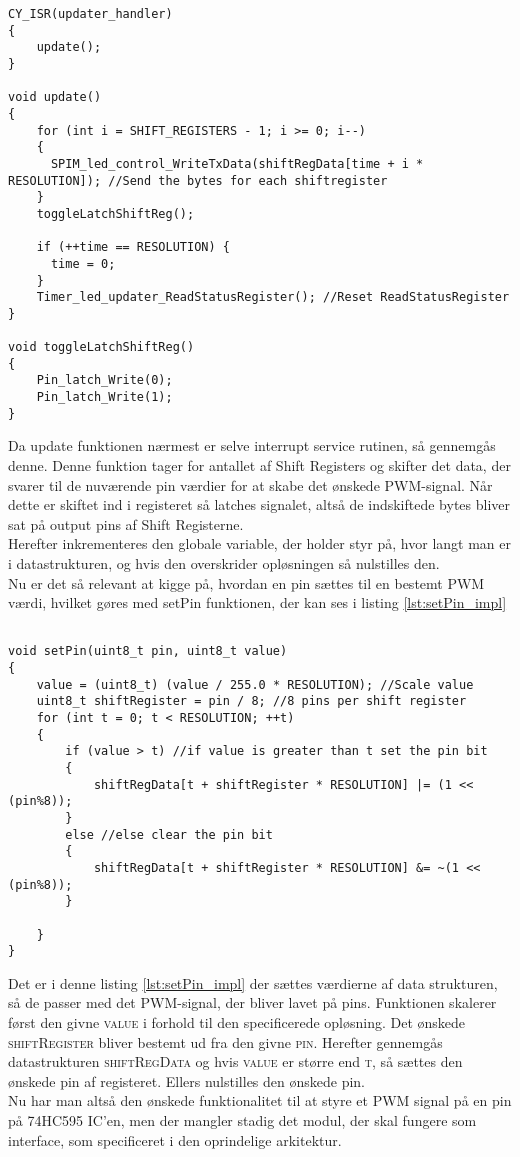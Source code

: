 \documentclass[Softwaredesign/Softwaredesign_main.tex]{subfiles}
\begin{document}
\begin{lstlisting}[caption={ISR & Update}, label={lst:ISR_Update_impl}, style=customc]
CY_ISR(updater_handler)
{
    update();
}                   

void update()
{
    for (int i = SHIFT_REGISTERS - 1; i >= 0; i--)
    {
      SPIM_led_control_WriteTxData(shiftRegData[time + i * RESOLUTION]); //Send the bytes for each shiftregister
    }
    toggleLatchShiftReg();
    
    if (++time == RESOLUTION) {
      time = 0;
    }
    Timer_led_updater_ReadStatusRegister(); //Reset ReadStatusRegister
}

void toggleLatchShiftReg()
{
    Pin_latch_Write(0);
    Pin_latch_Write(1);
}
\end{lstlisting}

Da update funktionen nærmest er selve interrupt service rutinen, så gennemgås denne. Denne funktion tager for antallet af Shift Registers og skifter det data, der svarer til de nuværende pin værdier for at skabe det ønskede PWM-signal. Når dette er skiftet ind i registeret så latches signalet, altså de indskiftede bytes bliver sat på output pins af Shift Registerne.\\
Herefter inkrementeres den globale variable, der holder styr på, hvor langt man er i datastrukturen, og hvis den overskrider opløsningen så nulstilles den. \\
Nu er det så relevant at kigge på, hvordan en pin sættes til en bestemt PWM værdi, hvilket gøres med setPin funktionen, der kan ses i listing \ref{lst:setPin_impl}

\begin{lstlisting}[caption={Implementeringen af setPin}, label={lst:setPin_impl},
style=customc]

void setPin(uint8_t pin, uint8_t value)
{
    value = (uint8_t) (value / 255.0 * RESOLUTION); //Scale value
    uint8_t shiftRegister = pin / 8; //8 pins per shift register
    for (int t = 0; t < RESOLUTION; ++t)
    {
        if (value > t) //if value is greater than t set the pin bit
        {
            shiftRegData[t + shiftRegister * RESOLUTION] |= (1 << (pin%8));
        }
        else //else clear the pin bit
        {
            shiftRegData[t + shiftRegister * RESOLUTION] &= ~(1 << (pin%8));
        }
        
    }
}
\end{lstlisting}

Det er i denne listing \ref{lst:setPin_impl} der sættes værdierne af data strukturen, så de passer med det PWM-signal, der bliver lavet på pins. Funktionen skalerer først den givne \textsc{value} i forhold til den specificerede opløsning. Det ønskede \textsc{shiftRegister} bliver bestemt ud fra den givne \textsc{pin}. Herefter gennemgås datastrukturen \textsc{shiftRegData} og hvis \textsc{value} er større end \textsc{t}, så sættes den ønskede pin af registeret. Ellers nulstilles den ønskede pin.
\\Nu har man altså den ønskede funktionalitet til at styre et PWM signal på en pin på 74HC595 IC'en, men der mangler stadig det modul, der skal fungere som interface, som specificeret i den oprindelige arkitektur.
\end{document}
